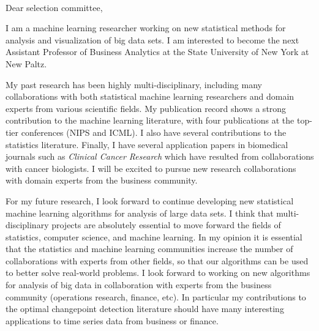 \documentclass{article}
\begin{document}
\mbox{ }

Dear selection committee,

I am a 
machine learning researcher working on new statistical methods for
analysis and visualization of big data sets.
I am interested to become the next
Assistant Professor of Business Analytics at the State University of
New York at New Paltz.

My past research has been highly multi-disciplinary, including many
collaborations with 
both statistical machine learning researchers
and domain experts from various scientific fields. 
My publication record shows a strong
contribution to the machine learning literature, with four
publications at the top-tier conferences (NIPS and ICML). I also have
several contributions to the statistics 
literature.
Finally, I have several application papers in biomedical journals such
as {\it Clinical Cancer Research} which have resulted from
collaborations with cancer biologists. I will be excited to pursue new
research collaborations with domain experts from the business
community. 

For my future research, I look forward to continue developing new
statistical machine learning algorithms for analysis of large 
data sets. I think that multi-disciplinary projects are absolutely essential
to move forward the fields of 
statistics, computer science, and machine learning. 
In my opinion it
is essential that the statistics and machine learning communities
increase the number
of collaborations with 
experts from other fields,
so that our algorithms can be
used to better solve real-world problems.
I look
forward to working on new algorithms for analysis of big data 
in collaboration with experts from 
the business community
(operations research, finance, etc). In particular my contributions to
the optimal changepoint detection literature should have many
interesting applications to time series data from business or finance.
\end{document}
